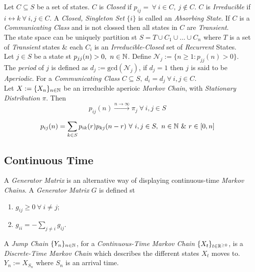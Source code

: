 \documentclass[11pt,a4paper]{article}
\begin{document}
Let $C\subseteq S$ be a set of states. $C$ is \textit{Closed} if $p_{ij}=\ \forall\ i\in C,\ j\notin C$. $C$ is \textit{Irreducible} if $i\leftrightarrow k\ \forall\ i,j\in C$. A \textit{Closed, Singleton Set} $\{i\}$ is called an \textit{Absorbing State}. If $C$ is a \textit{Communicating Class} and is not clossed then all states in $C$ are \textit{Transient}.\\

The state space can be uniquely partition st $S=T\cup C_1\cup\dots\cup C_n$ where $T$ is a set of \textit{Transient} states \& each $C_i$ is an \textit{Irreducible-Closed} set of \textit{Recurrent} States.\\

Let $j\in S$ be a state st $p_{jj}(n)>0,\ n\in\nats$. Define $\mathcal{N}_j:=\{n\geq1:p_{jj}(n)>0\}$. The \textit{period} of $j$ is defined as $d_j:=\mathrm{gcd}(\mathcal{N}_j)$, if $d_j=1$ then $j$ is said to be \textit{Aperiodic}. For a \textit{Communicating Class} $C\subseteq S,\ d_i=d_j\ \forall\ i,j\in C$.\\

Let $X:=\{X_n\}_{n\in\mathbb{N}}$ be an irreducible aperioic \textit{Markov Chain}, with \textit{Stationary Distribution} $\pi$. Then
$$p_{ij}(n)\xrightarrow{n\to\infty}\pi_j\ \forall\ i,j\in S$$

$$p_{ij}(n)=\sum_{k\in S}p_{ik}(r)p_{kj}(n-r)\ \forall\ i,j\in S,\ n\in\nats\ \&\ r\in[0,n]$$

\subsection{Continuous Time}

A \textit{Generator Matrix} is an alternative way of displaying continuous-time \textit{Markov Chains}. A \textit{Generator Matrix} $G$ is defined st
\begin{enumerate}
	\item $g_{ij}\geq0\ \forall\ i\neq j$;
	\item $g_{ii}=-\sum_{j\neq i}g_{ij}$.
\end{enumerate}

A \textit{Jump Chain} $\{Y_n\}_{n\in\mathbb{N}}$, for a \textit{Continuous-Time Markov Chain} $\{X_t\}_{t\in\mathbb{R}^{\geq0}}$, is a \textit{Discrete-Time Markov Chain} which describes the different states $X_t$ moves to. $Y_n:=X_{S_n}$ where $S_n$ is an arrival time.\\
\end{document}
